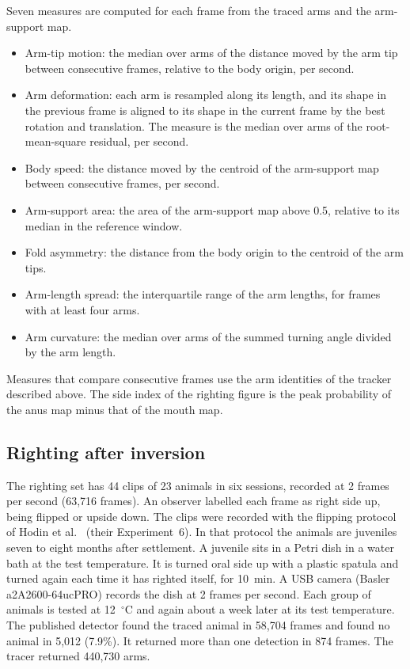 Seven measures are computed for each frame from the traced arms and the arm-support map.
\begin{itemize}
\item Arm-tip motion: the median over arms of the distance moved by the arm tip between consecutive frames, relative to the body origin, per second.
\item Arm deformation: each arm is resampled along its length, and its shape in the previous frame is aligned to its shape in the current frame by the best rotation and translation. The measure is the median over arms of the root-mean-square residual, per second.
\item Body speed: the distance moved by the centroid of the arm-support map between consecutive frames, per second.
\item Arm-support area: the area of the arm-support map above 0.5, relative to its median in the reference window.
\item Fold asymmetry: the distance from the body origin to the centroid of the arm tips.
\item Arm-length spread: the interquartile range of the arm lengths, for frames with at least four arms.
\item Arm curvature: the median over arms of the summed turning angle divided by the arm length.
\end{itemize}
Measures that compare consecutive frames use the arm identities of the tracker described above.
The side index of the righting figure is the peak probability of the anus map minus that of the mouth map.

\subsection*{Righting after inversion}

The righting set has 44 clips of 23 animals in six sessions, recorded at 2 frames per second (63,716 frames).
An observer labelled each frame as right side up, being flipped or upside down.
The clips were recorded with the flipping protocol of Hodin et al.~\cite{hodin2025star} (their Experiment~6).
In that protocol the animals are juveniles seven to eight months after settlement.
A juvenile sits in a Petri dish in a water bath at the test temperature.
It is turned oral side up with a plastic spatula and turned again each time it has righted itself, for 10~min.
A USB camera (Basler a2A2600-64ucPRO) records the dish at 2 frames per second.
Each group of animals is tested at 12~$^{\circ}$C and again about a week later at its test temperature.
The published detector found the traced animal in 58,704 frames and found no animal in 5,012 (7.9\%).
It returned more than one detection in 874 frames.
The tracer returned 440,730 arms.


